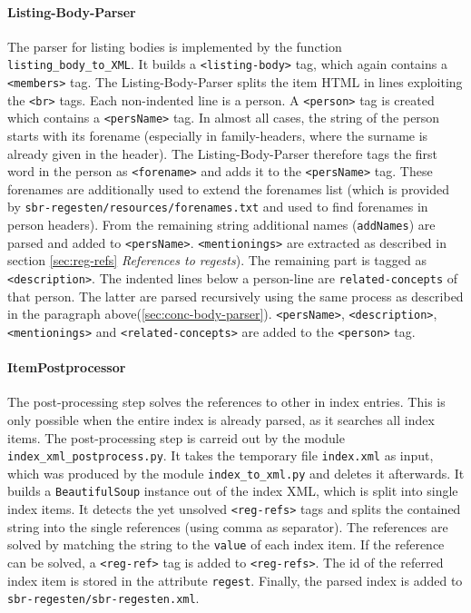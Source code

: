 \paragraph{Listing-Body-Parser}
The parser for listing bodies is implemented by the function \texttt{listing\_body\_to\_XML}. It builds a \texttt{<listing-body>} tag, which again contains a \texttt{<members>} tag. The Listing-Body-Parser splits the item HTML in lines exploiting the \texttt{<br>} tags. Each non-indented line is a person. A \texttt{<person>} tag is created which contains a \texttt{<persName>} tag. In almost all cases, the string of the person starts with its forename (especially in family-headers, where the surname is already given in the header). The Listing-Body-Parser therefore tags the first word in the person as \texttt{<forename>} and adds it to the \texttt{<persName>} tag. These forenames are additionally used to extend the forenames list (which is provided by \texttt{sbr-regesten/resources/forenames.txt} and used to find forenames in person headers). From the remaining string additional names (\texttt{addNames}) are parsed and added to \texttt{<persName>}. \texttt{<mentionings>} are extracted as described in section \ref{sec:reg-refs} \textit{References to regests}). The remaining part is tagged as \texttt{<description>}. The indented lines below a person-line are \texttt{related-concepts} of that person. The latter are parsed recursively using the same process as described in the paragraph above(\ref{sec:conc-body-parser}). \texttt{<persName>}, \texttt{<description>}, \texttt{<mentionings>} and \texttt{<related-concepts>} are added to the \texttt{<person>} tag.


\paragraph{ItemPostprocessor}
\label{sec:postproc}
The post-processing step solves the references to other in index entries. This is only possible when the entire index is already parsed, as it searches all index items. The post-processing step is carreid out by the module \texttt{index\_xml\_postprocess.py}. It takes the temporary file \texttt{index.xml} as input, which was produced by the module \texttt{index\_to\_xml.py} and deletes it afterwards. It builds a \texttt{BeautifulSoup} instance out of the index XML, which is split into single index items. It detects the yet unsolved \texttt{<reg-refs>} tags and splits the contained string into the single references (using comma as separator). The references are solved by matching the string to the \texttt{value} of each index item. If the reference can be solved, a \texttt{<reg-ref>} tag is added to \texttt{<reg-refs>}. The id of the referred index item is stored in the attribute \texttt{regest}. Finally, the parsed index is added to \texttt{sbr-regesten/sbr-regesten.xml}.

